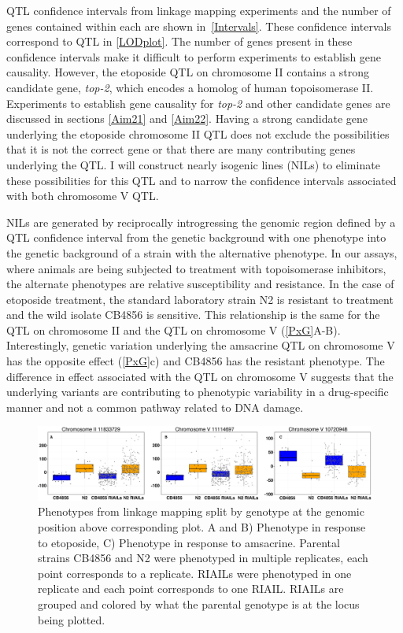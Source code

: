 \documentclass[12pt]{article}
\begin{document}
QTL confidence intervals from linkage mapping experiments and the number of genes contained within each are shown in~\autoref{Intervals}. These confidence intervals correspond to QTL in \autoref{LODplot}. The number of genes present in these confidence intervals make it difficult to perform experiments to establish gene causality. However, the etoposide QTL on chromosome II contains a strong candidate gene, {\it top-2}, which encodes a homolog of human topoisomerase II\textalpha. Experiments to establish gene causality for {\it top-2} and other candidate genes are discussed in sections \ref{Aim21} and \ref{Aim22}. Having a strong candidate gene underlying the etoposide chromosome II QTL does not exclude the possibilities that it is not the correct gene or that there are many contributing genes underlying the QTL. I will construct nearly isogenic lines (NILs) to eliminate these possibilities for this QTL and to narrow the confidence intervals associated with both chromosome V QTL.

\vspace{5pt}

NILs are generated by reciprocally introgressing the genomic region defined by a QTL confidence interval from the genetic background with one phenotype into the genetic background of a strain with the alternative phenotype. In our assays, where animals are being subjected to treatment with topoisomerase inhibitors, the alternate phenotypes are relative susceptibility and resistance. In the case of etoposide treatment, the standard laboratory strain N2 is resistant to treatment and the wild isolate CB4856 is sensitive. This relationship is the same for the QTL on chromosome II and the QTL on chromosome V (\autoref{PxG}A-B). Interestingly, genetic variation underlying the amsacrine QTL on chromosome V has the opposite effect (\autoref{PxG}c) and CB4856 has the resistant phenotype. The difference in effect associated with the QTL on chromosome V suggests that the underlying variants are contributing to phenotypic variability in a drug-specific manner and not a common pathway related to DNA damage. 

\begin{figure}[h]
\captionsetup{font=tiny}
\centering
\includegraphics[scale=0.25]{Figures/Figure2.pdf}

\caption[Phenotype by genotype splits for QTL]{Phenotypes from linkage mapping split by genotype at the genomic position above corresponding plot. A and B) Phenotype in response to etoposide, C) Phenotype in response to amsacrine. Parental strains CB4856 and N2 were phenotyped in multiple replicates, each point corresponds to a replicate. RIAILs were phenotyped in one replicate and each point corresponds to one RIAIL. RIAILs are grouped and colored by what the parental genotype is at the locus being plotted.}
\label{PxG}
\end{figure}
\end{document}
